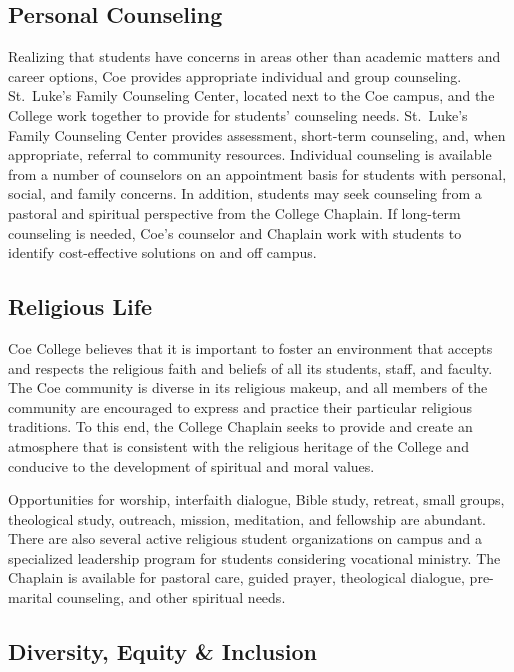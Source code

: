 \documentclass[
  letterpaper,
]{scrbook}
\begin{document}
\hypertarget{personal-counseling}{%
\subsection{Personal Counseling}\label{personal-counseling}}

Realizing that students have concerns in areas other than academic
matters and career options, Coe provides appropriate individual and
group counseling. St.~Luke's Family Counseling Center, located next to
the Coe campus, and the College work together to provide for students'
counseling needs. St.~Luke's Family Counseling Center provides
assessment, short-term counseling, and, when appropriate, referral to
community resources. Individual counseling is available from a number of
counselors on an appointment basis for students with personal, social,
and family concerns. In addition, students may seek counseling from a
pastoral and spiritual perspective from the College Chaplain. If
long-term counseling is needed, Coe's counselor and Chaplain work with
students to identify cost-effective solutions on and off campus.

\hypertarget{religious-life}{%
\subsection{Religious Life}\label{religious-life}}

Coe College believes that it is important to foster an environment that
accepts and respects the religious faith and beliefs of all its
students, staff, and faculty. The Coe community is diverse in its
religious makeup, and all members of the community are encouraged to
express and practice their particular religious traditions. To this end,
the College Chaplain seeks to provide and create an atmosphere that is
consistent with the religious heritage of the College and conducive to
the development of spiritual and moral values.

Opportunities for worship, interfaith dialogue, Bible study, retreat,
small groups, theological study, outreach, mission, meditation, and
fellowship are abundant. There are also several active religious student
organizations on campus and a specialized leadership program for
students considering vocational ministry. The Chaplain is available for
pastoral care, guided prayer, theological dialogue, pre-marital
counseling, and other spiritual needs.

\hypertarget{diversity-equity-inclusion}{%
\subsection{Diversity, Equity \&
Inclusion}\label{diversity-equity-inclusion}}
\end{document}
